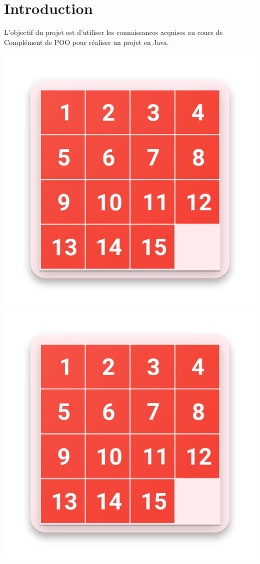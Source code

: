 \documentclass{report}
\begin{document}
	\newpage

	\tableofcontents

	\newpage

\section{Introduction}
	L'objectif du projet est d'utiliser les connaissances acquises au cours de Complément de POO pour réaliser un projet en Java.
	
	\begin{center}
	\includegraphics[scale=0.2]{images/taquin.png}
	\includegraphics[scale=0.2]{images/taquin.png}

\end{center}
\end{document}
